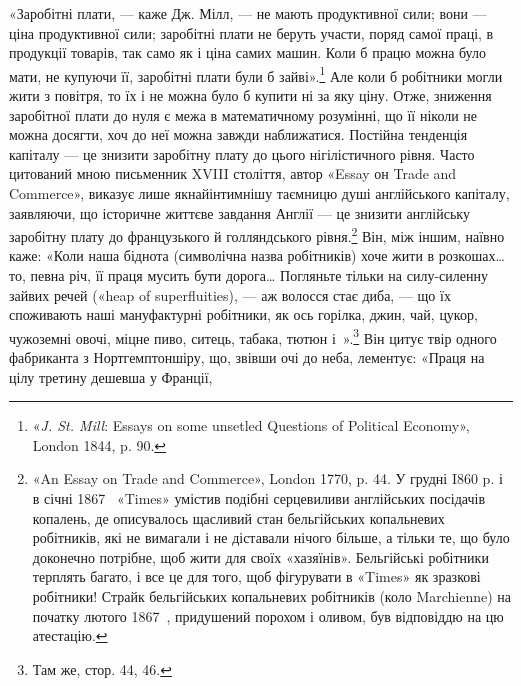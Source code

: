 «Заробітні плати, — каже Дж. Мілл, — не мають продуктивної
сили; вони — ціна продуктивної сили; заробітні плати не
беруть участи, поряд самої праці, в продукції товарів, так само
як і ціна самих машин. Коли б працю можна було мати, не купуючи
її, заробітні плати були б зайві».\footnote{
«\emph{J. St. Mill}: Essays on some unsetled Questions of Political Economy»,
London 1844, p. 90.
} Але коли б робітники
могли жити з повітря, то їх і не можна було б купити ні за яку ціну.
Отже, зниження заробітної плати до нуля є межа в математичному
розумінні, що її ніколи не можна досягти, хоч до неї можна
завжди наближатися. Постійна тенденція капіталу — це знизити
заробітну плату до цього нігілістичного рівня. Часто цитований
мною письменник XVIII століття, автор «Essay он Trade and
Commerce», виказує лише якнайінтимнішу таємницю душі англійського
капіталу, заявляючи, що історичне життєве завдання
Англії — це знизити англійську заробітну плату до французького
й голляндського рівня.\footnote{
«An Essay on Trade and Commerce», London 1770, p. 44. У грудні
I860 p. і в січні 1867~ «Times» умістив подібні серцевиливи англійських
посідачів копалень, де описувалось щасливий стан бельгійських
копальневих робітників, які не вимагали і не діставали нічого більше,
а тільки те, що було доконечно потрібне, щоб жити для своїх «хазяїнів».
Бельгійські робітники терплять багато, і все це для того, щоб фігурувати
в «Times» як зразкові робітники! Страйк бельгійських копальневих
робітників (коло Marchienne) на початку лютого 1867~, придушений
порохом і оливом, був відповіддю на цю атестацію.
} Він, між іншим, наївно каже: «Коли
наша біднота (символічна назва робітників) хоче жити в розкошах\dots{}
то, певна річ, її праця мусить бути дорога\dots{} Погляньте
тільки на силу-силенну зайвих речей («heap of superfluities), —
аж волосся стає диба, — що їх споживають наші мануфактурні
робітники, як ось горілка, джин, чай, цукор, чужоземні
овочі, міцне пиво, ситець, табака, тютюн і~».\footnote{
Там же, стор. 44, 46.
} Він цитує
твір одного фабриканта з Нортгемптоншіру, що, звівши очі до
неба, лементує: «Праця на цілу третину дешевша у Франції,
\parbreak{}  %
